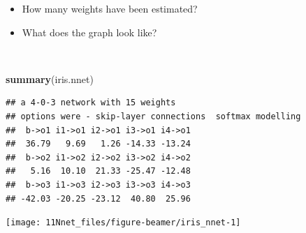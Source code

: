 \documentclass[10pt,ignorenonframetext,]{beamer}
\newenvironment{Shaded}{\begin{snugshade}}{\end{snugshade}}
\newcommand{\KeywordTok}[1]{\textcolor[rgb]{0.13,0.29,0.53}{\textbf{#1}}}
\newcommand{\NormalTok}[1]{#1}
\begin{document}
\begin{frame}[fragile]

\begin{itemize}
\item
  How many weights have been estimated?
\item
  What does the graph look like?
\end{itemize}

\(~\)

\scriptsize

\begin{Shaded}
\begin{Highlighting}[]
\KeywordTok{summary}\NormalTok{(iris.nnet)}
\end{Highlighting}
\end{Shaded}

\begin{verbatim}
## a 4-0-3 network with 15 weights
## options were - skip-layer connections  softmax modelling 
##  b->o1 i1->o1 i2->o1 i3->o1 i4->o1 
##  36.79   9.69   1.26 -14.33 -13.24 
##  b->o2 i1->o2 i2->o2 i3->o2 i4->o2 
##   5.16  10.10  21.33 -25.47 -12.48 
##  b->o3 i1->o3 i2->o3 i3->o3 i4->o3 
## -42.03 -20.25 -23.12  40.80  25.96
\end{verbatim}

\end{frame}

\begin{frame}

\begin{center}\texttt{[image: 11Nnet\_files/figure-beamer/iris\_nnet-1]} \end{center}

\end{frame}
\end{document}
